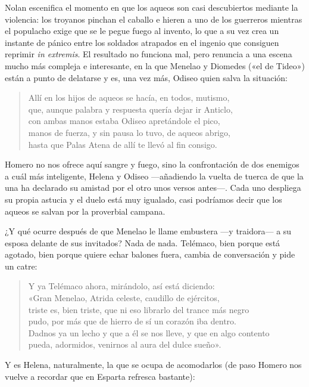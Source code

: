 \documentclass[11pt,a4paper]{article}
\begin{document}
Nolan escenifica el momento en que los aqueos son casi descubiertos mediante la violencia: los troyanos pinchan el caballo e hieren a uno de los guerreros mientras el populacho exige que se le pegue fuego al invento, lo que a su vez crea un instante de pánico entre los soldados atrapados en el ingenio que consiguen reprimir \emph{in extremis}. El resultado no funciona mal, pero renuncia a una escena mucho más compleja e interesante, en la que Menelao y Diomedes («el de Tideo») están a punto de delatarse y es, una vez más, Odiseo quien salva la situación:

\begin{verse}
Allí en los hijos de aqueos se hacía, en todos, mutismo,\\
que, aunque palabra y respuesta quería dejar ir Anticlo,\\
con ambas manos estaba Odiseo apretándole el pico,\\
manos de fuerza, y sin pausa lo tuvo, de aqueos abrigo,\\
hasta que Palas Atena de allí te llevó al fin consigo.
\end{verse}

Homero no nos ofrece aquí sangre y fuego, sino la confrontación de dos enemigos a cuál más inteligente, Helena y Odiseo ---añadiendo la vuelta de tuerca de que la una ha declarado su amistad por el otro unos versos antes---. Cada uno despliega su propia astucia y el duelo está muy igualado, casi podríamos decir que los aqueos se salvan por la proverbial campana.

¿Y qué ocurre después de que Menelao le llame embustera ---y traidora--- a su esposa delante de sus invitados? Nada de nada. Telémaco, bien porque está agotado, bien porque quiere echar balones fuera, cambia de conversación y pide un catre:

\begin{verse}
Y ya Telémaco ahora, mirándolo, así está diciendo:\\
«Gran Menelao, Atrida celeste, caudillo de ejércitos,\\
triste es, bien triste, que ni eso librarlo del trance más negro\\
pudo, por más que de hierro de sí un corazón iba dentro.\\
Dadnos ya un lecho y que a él se nos lleve, y que en algo contento\\
pueda, adormidos, venirnos al aura del dulce sueño».
\end{verse}

Y es Helena, naturalmente, la que se ocupa de acomodarlos (de paso Homero nos vuelve a recordar que en Esparta refresca bastante):
\end{document}
